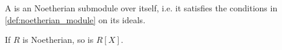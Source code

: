 \begin{definition}\label{def:noetherian_ring}
  A  is an Noetherian submodule over itself, i.e. it satisfies the conditions in \cref{def:noetherian_module} on its ideals.
\end{definition}

\begin{theorem}\label{thm:hilbert_basis_theorem}\cite[418]{Knapp2016BAlg}
  If \( R \) is Noetherian, so is \( R[X] \).
\end{theorem}
